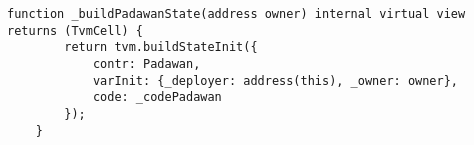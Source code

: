 \begin{lstlisting}[firstnumber=16]
    function _buildPadawanState(address owner) internal virtual view returns (TvmCell) {
        return tvm.buildStateInit({
            contr: Padawan,
            varInit: {_deployer: address(this), _owner: owner},
            code: _codePadawan
        });
    }
\end{lstlisting}

